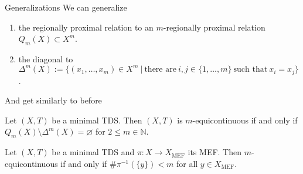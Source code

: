 \begin{frame}{Generalizations}
    We can generalize
    \begin{enumerate}
        \item the regionally proximal relation to an $m$-regionally proximal relation $Q_m(X) \subset X^{m}$.
        \item the diagonal to 
        $\Delta^m(X) := \{ (x_1, \dots, x_m) \in X^m \ | \ \text{there are} \ i, j \in \{1, \dots, m\} \ \text{such that} \ x_i = x_j \}$.
    \end{enumerate}

\end{frame}

\begin{frame}
    And get similarly to before
    \begin{theorem}
	    \label{thm:m-equiRelationChar}
	    Let $(X, T)$ be a minimal TDS.
	    Then $(X, T)$ is $m$-equicontinuous if and only if $Q_m(X) \setminus \Delta^m(X) = \varnothing$ for $2 \leq m \in \mathbb{N}$.
    \end{theorem}
    \pause
    \begin{theorem}
        Let $(X, T)$ be a minimal TDS and $\pi : X \to X_\text{MEF}$ its MEF.
        Then $m$-equicontinuous if and only if $\# \pi^{-1}(\{ y \}) < m$ for all $y \in X_\text{MEF}$.
    \end{theorem} 
\end{frame}